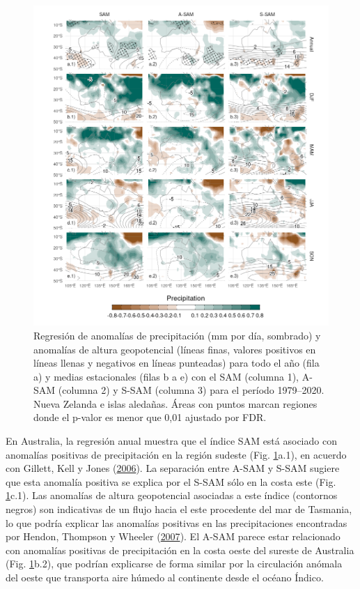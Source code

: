 \documentclass[12pt,oneside,a4paper]{reedthesis}
\begin{document}
\begin{figure}

{\centering \includegraphics{figures/30-sam/pp-regr-oceania-1} 

}

\caption{Regresión de anomalías de precipitación (mm por día, sombrado) y anomalías de altura geopotencial (líneas finas, valores positivos en líneas llenas y negativos en líneas punteadas) para todo el año (fila a) y medias estacionales (filas b a e) con el SAM (columna 1), A-SAM (columna 2) y S-SAM (columna 3) para el período 1979--2020. Nueva Zelanda e islas aledañas. Áreas con puntos marcan regiones donde el p-valor es menor que 0,01 ajustado por FDR.}\label{fig:pp-regr-oceania}
\end{figure}

En Australia, la regresión anual muestra que el índice SAM está asociado con anomalías positivas de precipitación en la región sudeste (Fig. \ref{fig:pp-regr-oceania}a.1), en acuerdo con Gillett, Kell y Jones (\protect\hyperlink{ref-gillett2006}{2006}).
La separación entre A-SAM y S-SAM sugiere que esta anomalía positiva se explica por el S-SAM sólo en la costa este (Fig. \ref{fig:pp-regr-oceania}c.1).
Las anomalías de altura geopotencial asociadas a este índice (contornos negros) son indicativas de un flujo hacia el este procedente del mar de Tasmania, lo que podría explicar las anomalías positivas en las precipitaciones encontradas por Hendon, Thompson y Wheeler (\protect\hyperlink{ref-hendon2007}{2007}).
El A-SAM parece estar relacionado con anomalías positivas de precipitación en la costa oeste del sureste de Australia (Fig. \ref{fig:pp-regr-oceania}b.2), que podrían explicarse de forma similar por la circulación anómala del oeste que transporta aire húmedo al continente desde el océano Índico.
\end{document}
